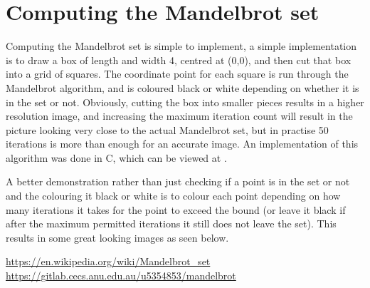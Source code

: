 \documentclass[a4paper,12pt]{article}
\begin{document}
\section{Computing the Mandelbrot set}
Computing the Mandelbrot set is simple to implement, a simple implementation is to draw a box of length and width 4, centred at (0,0), and then cut that box into a grid of squares. The coordinate point for each
square is run through the Mandelbrot algorithm, and is coloured black or white depending on whether it is in the set or not. Obviously, cutting the box into smaller pieces results in a higher resolution
image, and increasing the maximum iteration count will result in the picture looking very close to the actual Mandelbrot set, but in practise 50 iterations is more than enough for an accurate image.
An implementation of this algorithm was done in C, which can be viewed at \cite{git}.

A better demonstration rather than just checking if a point is in the set or not and the colouring it black or white is to colour each point depending on how many iterations it takes for the point
to exceed the bound (or leave it black if after the maximum permitted iterations it still does not leave the set). This results in some great looking images as seen below.






\begin{thebibliography}{99}

 \url{https://en.wikipedia.org/wiki/Mandelbrot_set}
 \url{https://gitlab.cecs.anu.edu.au/u5354853/mandelbrot}
\end{thebibliography}
\end{document}
